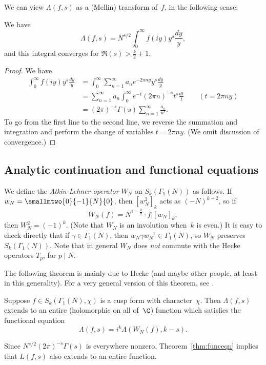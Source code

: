 \documentclass{report}
\begin{document}
We can view $\Lambda(f,s)$ as a (Mellin) transform of~$f$,
in the following sense:
\begin{proposition}\label{prop:mellin}
We have
$$ \Lambda(f,s) = N^{s/2} \int_{0}^{\infty} f(iy) y^s \frac{dy}{y}, $$
and this integral converges for $\Re(s)>\frac{k}{2}+1$.
\end{proposition}
\begin{proof}
We have
\begin{align*}
 \int_0^\infty f(iy)y^s \frac{dy}{y} &=
   \int_0^\infty \sum_{n=1}^{\infty} a_n e^{-2\pi n y} y^s \frac{dy}{y} \\
  &= \sum_{n=1}^{\infty} a_n \int_{0}^{\infty} e^{-t}(2\pi n)^{-s} t^s\frac{dt}{t} \qquad(t=2\pi ny)\\
  &= (2\pi)^{-s} \Gamma(s) \sum_{n=1}^{\infty} \frac{a_n}{n^s}.
\end{align*}
To go from the first line to the second line, we reverse the summation
and integration and perform the change of variables $t=2\pi n y$.
(We omit discussion of convergence.)
\end{proof}


\subsection{Analytic continuation and functional equations}
We define the {\em Atkin-Lehner operator} $W_N$ on $S_k(\Gamma_1(N))$
as follows.  If $w_N=\smallmtwo{0}{-1}{N}{0}$, then $[w_N^2]_k$ acts
as $(-N)^{k-2}$, so if
$$
  W_N(f) = N^{1-\frac{k}{2}}\cdot f|[w_N]_k,
  $$
  then $W_N^2 = (-1)^k$. (Note that $W_N$ is an involution when~$k$
  is even.)  It is easy to check directly that if
  $\gamma\in\Gamma_1(N)$, then $w_N \gamma w_N^{-1}\in\Gamma_1(N)$, so
  $W_N$ preserves $S_k(\Gamma_1(N))$.  Note that in general $W_N$ does
  {\em not} commute with the Hecke operators $T_p$, for $p\mid N$.

  The following theorem is mainly due to Hecke (and maybe other
  people, at least in this generality).  For a very general version of
  this theorem, see \cite{winnie:newforms}.
\begin{theorem}\label{thm:funceqn}
Suppose $f\in S_k(\Gamma_1(N),\chi)$ is a cusp form with character~$\chi$.
Then $\Lambda(f,s)$ extends to an entire (holomorphic on all of~$\C$)
function which satisfies the functional equation
$$
  \Lambda(f,s) = i^k \Lambda(W_N(f), k-s).
$$
\end{theorem}
Since $N^{s/2}(2\pi)^{-s} \Gamma(s)$ is everywhere nonzero,
Theorem~\ref{thm:funceqn} implies that $L(f,s)$ also extends to
an entire function.
\end{document}
